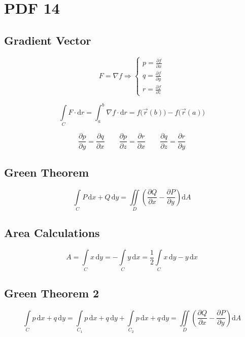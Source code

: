 \documentclass[12pt, fleqn]{book}
\begin{document}
\chapter{PDF 14}\label{pdf14}
    \section{Gradient Vector}
		\begin{equation}
			F = \nabla f \Rightarrow
			\begin{cases}
				p = \frac{\partial f}{\partial x} \\
				q = \frac{\partial f}{\partial y} \\
				r = \frac{\partial f}{\partial z} 
			\end{cases}
		\end{equation} 
		
		\begin{equation}
			\int\limits_C F \cdot \mathrm{d}r = \int_{a}^{b} \nabla f \cdot \mathrm{d}r = f\big(\vec{r}(b)\big) - f\big(\vec{r}(a)\big)
		\end{equation}     
		
		\begin{equation}
			\frac{\partial p}{\partial y} = \frac{\partial q}{\partial x} \qquad
			\frac{\partial p}{\partial z} = \frac{\partial r}{\partial x} \qquad
			\frac{\partial q}{\partial z} = \frac{\partial r}{\partial y}
		\end{equation}
		
		\section{Green Theorem}
			\begin{equation}
				\int\limits_C P \, \mathrm{d}x + Q \, \mathrm{d}y = \iint\limits_D \left(\frac{\partial Q}{\partial x} - \frac{\partial P}{\partial y}\right) \mathrm{d}A
			\end{equation}
		
		\section{Area Calculations}
			\begin{equation}
				A = \int\limits_C x \, \mathrm{d}y = - \int\limits_C y \, \mathrm{d}x = \frac{1}{2} \int\limits_C x \, \mathrm{d}y - y \, \mathrm{d}x
			\end{equation}

		\section{Green Theorem 2}
			\begin{equation}
				\int\limits_C p \, \mathrm{d}x + q \, \mathrm{d}y = \int\limits_{C_{1}} p \, \mathrm{d}x + q \, \mathrm{d}y + \int\limits_{C_{2}} p \, \mathrm{d}x + q \, \mathrm{d}y = \iint\limits_D \left(\frac{\partial Q}{\partial x} - \frac{\partial P}{\partial y}\right) \mathrm{d}A
			\end{equation}
		
\end{document}
